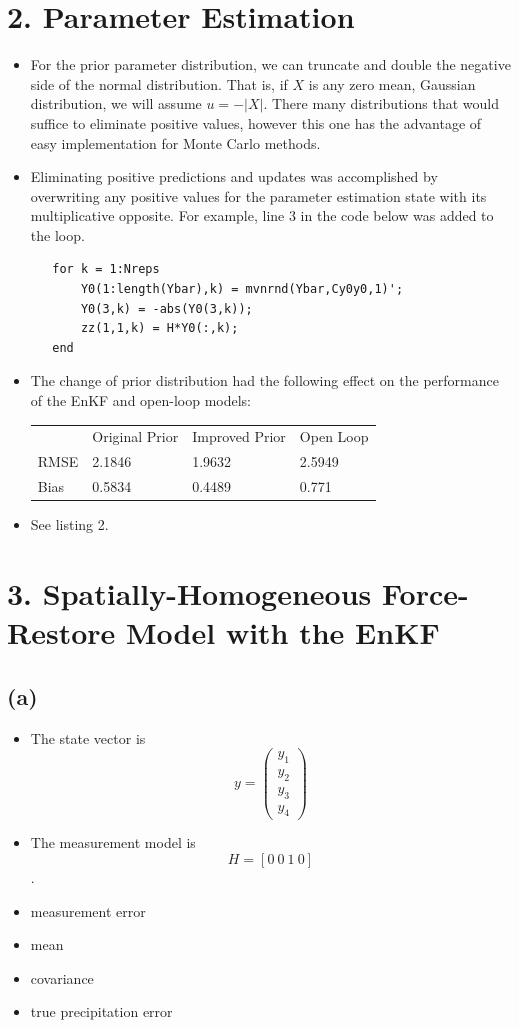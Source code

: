 \documentclass[letterpaper]{tufte-handout}
\begin{document}
  \section{2. Parameter Estimation}
  \begin{itemize}
    \item For the prior parameter distribution, we can truncate and double the negative side of the normal distribution. That is, if $X$ is any zero mean, Gaussian distribution, we will assume $u = -|X|$. There many distributions that would suffice to eliminate positive values, however this one has the advantage of easy implementation for Monte Carlo methods.
    \item Eliminating positive predictions and updates was accomplished by overwriting any positive values for the parameter estimation state with its multiplicative opposite. For example, line 3 in the code below was added to the loop.
      \begin{verbatim}
   for k = 1:Nreps
       Y0(1:length(Ybar),k) = mvnrnd(Ybar,Cy0y0,1)';
       Y0(3,k) = -abs(Y0(3,k));
       zz(1,1,k) = H*Y0(:,k);
   end
   \end{verbatim}
 \item The change of prior distribution had the following effect on the performance of the EnKF and open-loop models:
   \begin{table}
     \begin{tabular}{llll}
       & Original Prior & Improved Prior & Open Loop \\
       RMSE & 2.1846 & 1.9632 & 2.5949 \\
       Bias & 0.5834 & 0.4489 & 0.771
     \end{tabular}
   \end{table}
 \item See listing 2.
\end{itemize}
{\small
  
}
\section{3. Spatially-Homogeneous Force-Restore Model with the EnKF}
\subsection{(a)}
\begin{itemize}
\item The state vector is \[y = \begin{pmatrix} y_1 \\ y_2 \\ y_3 \\ y_4 \end{pmatrix}\]
  \item The measurement model is \[H = [0\ 0\ 1\ 0]\].
  \item measurement error
  \item mean
  \item covariance 
  \item true precipitation error
\end{itemize}
\end{document}
